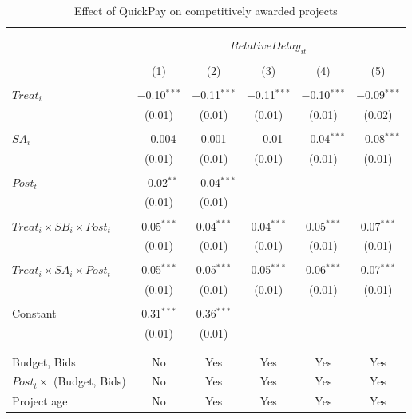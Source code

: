\documentclass[
]{article}
\begin{document}
\begin{table}[H] \centering 
  \caption{Effect of QuickPay on competitively awarded projects} 
  \label{} 
\small 
\begin{tabular}{@{\extracolsep{-2pt}}lccccc} 
\\[-1.8ex]\hline 
\hline \\[-1.8ex] 
\\[-1.8ex] & \multicolumn{5}{c}{$RelativeDelay_{it}$  } \\ 
\\[-1.8ex] & (1) & (2) & (3) & (4) & (5)\\ 
\hline \\[-1.8ex] 
 $Treat_i$ & $-$0.10$^{***}$ & $-$0.11$^{***}$ & $-$0.11$^{***}$ & $-$0.10$^{***}$ & $-$0.09$^{***}$ \\ 
  & (0.01) & (0.01) & (0.01) & (0.01) & (0.02) \\ 
  & & & & & \\ 
 $SA_i$ & $-$0.004 & 0.001 & $-$0.01 & $-$0.04$^{***}$ & $-$0.08$^{***}$ \\ 
  & (0.01) & (0.01) & (0.01) & (0.01) & (0.01) \\ 
  & & & & & \\ 
 $Post_t$ & $-$0.02$^{**}$ & $-$0.04$^{***}$ &  &  &  \\ 
  & (0.01) & (0.01) &  &  &  \\ 
  & & & & & \\ 
 $Treat_i \times SB_i \times Post_t$ & 0.05$^{***}$ & 0.04$^{***}$ & 0.04$^{***}$ & 0.05$^{***}$ & 0.07$^{***}$ \\ 
  & (0.01) & (0.01) & (0.01) & (0.01) & (0.01) \\ 
  & & & & & \\ 
 $Treat_i \times SA_i \times Post_t$ & 0.05$^{***}$ & 0.05$^{***}$ & 0.05$^{***}$ & 0.06$^{***}$ & 0.07$^{***}$ \\ 
  & (0.01) & (0.01) & (0.01) & (0.01) & (0.01) \\ 
  & & & & & \\ 
 Constant & 0.31$^{***}$ & 0.36$^{***}$ &  &  &  \\ 
  & (0.01) & (0.01) &  &  &  \\ 
  & & & & & \\ 
\hline \\[-1.8ex] 
Budget, Bids & No & Yes & Yes & Yes & Yes \\ 
$Post_t \times $  (Budget, Bids) & No & Yes & Yes & Yes & Yes \\ 
Project age & No & Yes & Yes & Yes & Yes \\ 

\end{tabular}
\end{table}
\end{document}
